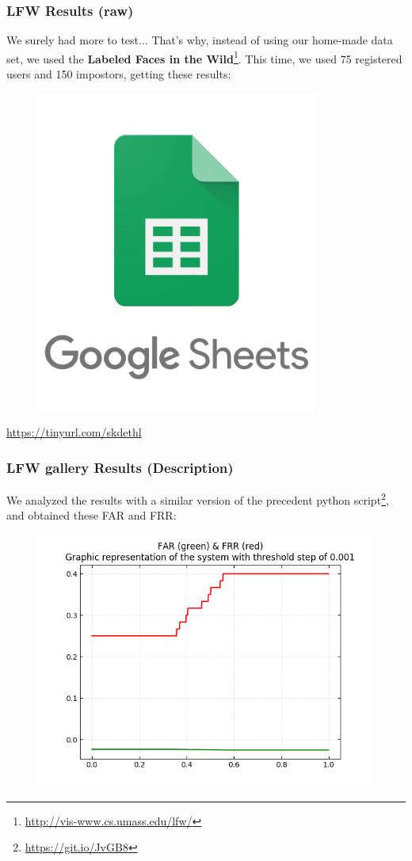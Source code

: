 \begin{frame} \frametitle{LFW Results (raw)}

	\vfill
	We surely had more to test... That's why, instead of using our home-made 
	data set, we used the \textbf{Labeled Faces in the Wild}\footnote{
	{\color{red} \url{http://vis-www.cs.umass.edu/lfw/}}}. This time, 
	we used 75 registered users and 150 impostors, getting these results:
	
	\begin{center}
		\begin{figure}[H]
			\includegraphics[width=.3\textwidth]{img/sheets}
		\end{figure}
		{\color{red} \url{https://tinyurl.com/skdethl}}	
	\end{center}
	\vfill

\end{frame}

\begin{frame} \frametitle{LFW gallery Results (Description)}

	We analyzed the results with a similar version of the precedent 
	python script\footnote{{\color{red} \url{https://git.io/JvGB8}}}, 
	and obtained these FAR and FRR:
	
	\vfill
	\begin{center}
		\begin{figure}[H]
			\includegraphics[width=.7\textwidth]{img/far-frr-lfw}
		\end{figure}
	\end{center}
	\vfill

\end{frame}
